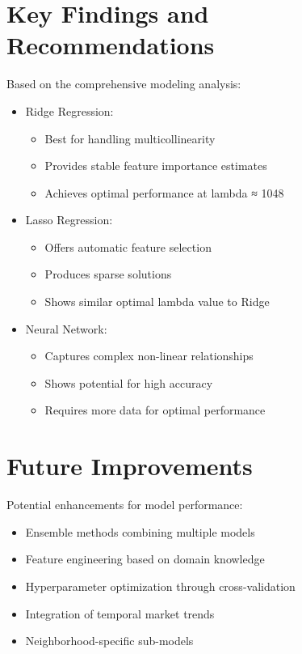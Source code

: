 \section{Key Findings and Recommendations}
Based on the comprehensive modeling analysis:
\begin{itemize}
    \item Ridge Regression:
    \begin{itemize}
        \item Best for handling multicollinearity
        \item Provides stable feature importance estimates
        \item Achieves optimal performance at lambda ≈ 1048
    \end{itemize}
    \item Lasso Regression:
    \begin{itemize}
        \item Offers automatic feature selection
        \item Produces sparse solutions
        \item Shows similar optimal lambda value to Ridge
    \end{itemize}
    \item Neural Network:
    \begin{itemize}
        \item Captures complex non-linear relationships
        \item Shows potential for high accuracy
        \item Requires more data for optimal performance
    \end{itemize}
\end{itemize}

\section{Future Improvements}
Potential enhancements for model performance:
\begin{itemize}
    \item Ensemble methods combining multiple models
    \item Feature engineering based on domain knowledge
    \item Hyperparameter optimization through cross-validation
    \item Integration of temporal market trends
    \item Neighborhood-specific sub-models
\end{itemize} 